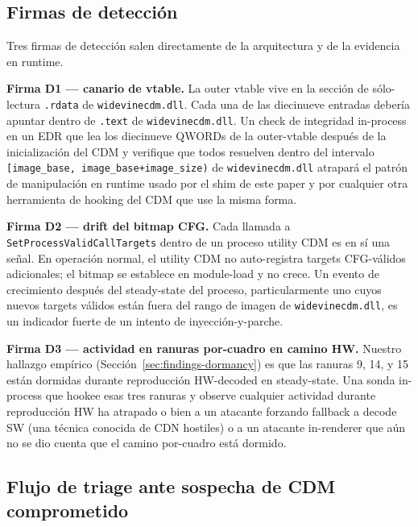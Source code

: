 \documentclass[11pt,letterpaper]{article}
\begin{document}
\subsection{Firmas de detección}

Tres firmas de detección salen directamente de la arquitectura
y de la evidencia en runtime.

\textbf{Firma D1 --- canario de vtable.} La outer vtable vive en
la sección de sólo-lectura \texttt{.rdata} de
\texttt{widevinecdm.dll}. Cada una de las diecinueve entradas
debería apuntar dentro de \texttt{.text} de
\texttt{widevinecdm.dll}. Un check de integridad in-process en
un EDR que lea los diecinueve QWORDs de la outer-vtable después
de la inicialización del CDM y verifique que todos resuelven
dentro del intervalo
\texttt{[image\_base, image\_base+image\_size)} de
\texttt{widevinecdm.dll} atrapará el patrón de manipulación en
runtime usado por el shim de este paper y por cualquier otra
herramienta de hooking del CDM que use la misma forma.

\textbf{Firma D2 --- drift del bitmap CFG.} Cada llamada a
\texttt{SetProcessValidCallTargets} dentro de un proceso utility
CDM es en sí una señal. En operación normal, el utility CDM no
auto-registra targets CFG-válidos adicionales; el bitmap se
establece en module-load y no crece. Un evento de crecimiento
después del steady-state del proceso, particularmente uno cuyos
nuevos targets válidos están fuera del rango de imagen de
\texttt{widevinecdm.dll}, es un indicador fuerte de un intento
de inyección-y-parche.

\textbf{Firma D3 --- actividad en ranuras por-cuadro en camino
HW.} Nuestro hallazgo empírico
(Sección~\ref{sec:findings-dormancy}) es que las ranuras 9, 14, y
15 están dormidas durante reproducción HW-decoded en
steady-state. Una sonda in-process que hookee esas tres ranuras
y observe cualquier actividad durante reproducción HW ha
atrapado o bien a un atacante forzando fallback a decode SW
(una técnica conocida de CDN hostiles) o a un atacante in-renderer
que aún no se dio cuenta que el camino por-cuadro está dormido.

\subsection{Flujo de triage ante sospecha de CDM comprometido}
\end{document}
